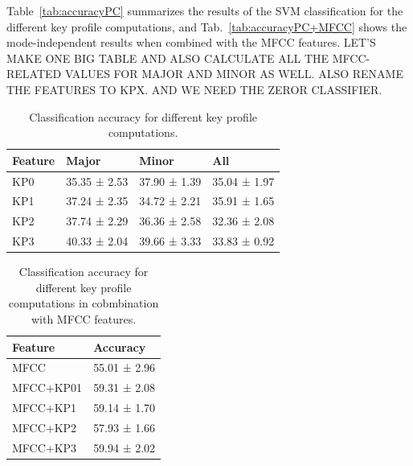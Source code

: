 \documentclass{article}
\begin{document}
Table~\ref{tab:accuracyPC} summarizes the results of the SVM classification for the different key profile computations, and Tab.~\ref{tab:accuracyPC+MFCC} shows the mode-independent results when combined with the MFCC features. LET'S MAKE ONE BIG TABLE AND ALSO CALCULATE ALL THE MFCC-RELATED VALUES FOR MAJOR AND MINOR AS WELL. ALSO RENAME THE FEATURES TO KPX. AND WE NEED THE ZEROR CLASSIFIER.
\begin{table}
\begin{center}
    \begin{tabular}{|l|l|l|l|}
      \hline 
	\bf Feature & \bf Major & \bf Minor & \bf All\\
	\hline
	KP0 & 35.35 ± 2.53 & 37.90 ± 1.39 & 35.04 ± 1.97\\
	\hline
	KP1 & 37.24 ± 2.35 & 34.72 ± 2.21 & 35.91 ± 1.65\\
	\hline
	KP2 & 37.74 ± 2.29 & 36.36 ± 2.58 & 32.36 ± 2.08\\
	\hline
	KP3 & 40.33 ± 2.04 & 39.66 ± 3.33 & 33.83 ± 0.92\\
 	\hline

    \end{tabular}
    \caption{Classification accuracy for different key profile computations.}
  \end{center}
\end{table}

\begin{table}
\begin{center}
    \begin{tabular}{|l|l|}
      \hline 
	\bf Feature & \bf Accuracy\\
	\hline
	MFCC & 55.01 ± 2.96\\
	\hline
	MFCC+KP01 & 59.31 ± 2.08\\
	\hline
	MFCC+KP1 & 59.14 ± 1.70\\
	\hline
	MFCC+KP2 & 57.93 ± 1.66\\
 	\hline
	MFCC+KP3 & 59.94 ± 2.02\\
 	\hline

    \end{tabular}
    \caption{Classification accuracy for different key profile computations in cobmbination with MFCC features.}
  \end{center}
\end{table}

\end{document}

